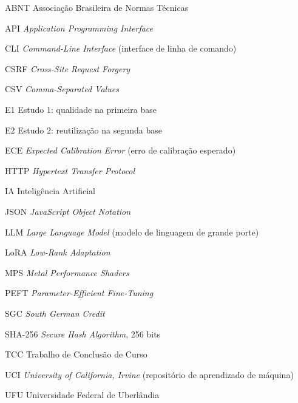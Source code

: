 \documentclass[12pt,oneside,a4paper,chapter=TITLE,section=TITLE,english,brazil]{abntex2}
\begin{document}
\begin{siglas}
  \item[ABNT] Associação Brasileira de Normas Técnicas
  \item[API] \emph{Application Programming Interface}
  \item[CLI] \emph{Command-Line Interface} (interface de linha de comando)
  \item[CSRF] \emph{Cross-Site Request Forgery}
  \item[CSV] \emph{Comma-Separated Values}
  \item[E1] Estudo 1: qualidade na primeira base
  \item[E2] Estudo 2: reutilização na segunda base
  \item[ECE] \emph{Expected Calibration Error} (erro de calibração esperado)
  \item[HTTP] \emph{Hypertext Transfer Protocol}
  \item[IA] Inteligência Artificial
  \item[JSON] \emph{JavaScript Object Notation}
  \item[LLM] \emph{Large Language Model} (modelo de linguagem de grande porte)
  \item[LoRA] \emph{Low-Rank Adaptation}
  \item[MPS] \emph{Metal Performance Shaders}
  \item[PEFT] \emph{Parameter-Efficient Fine-Tuning}
  \item[SGC] \emph{South German Credit}
  \item[SHA-256] \emph{Secure Hash Algorithm}, 256 bits
  \item[TCC] Trabalho de Conclusão de Curso
  \item[UCI] \emph{University of California, Irvine} (repositório de aprendizado de máquina)
  \item[UFU] Universidade Federal de Uberlândia
\end{siglas}

\tableofcontents*
\cleardoublepage

\textual








\postextual



\begin{apendicesenv}
\partapendices

\end{apendicesenv}
\end{document}
